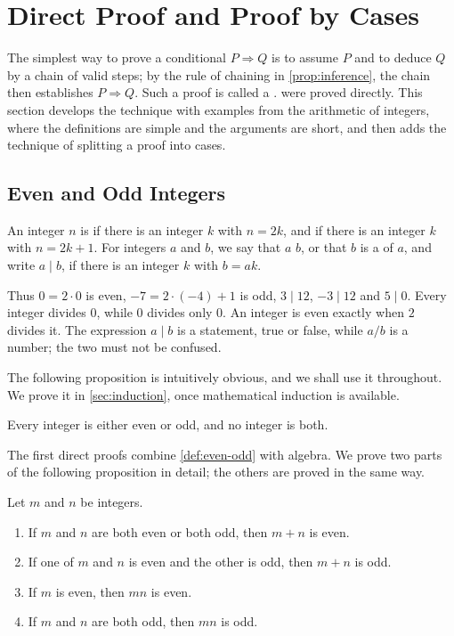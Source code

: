 \section{Direct Proof and Proof by Cases}
\label{sec:direct}

The simplest way to prove a conditional $P\Rightarrow Q$ is to assume $P$ and to deduce $Q$ by a chain of valid steps; by the rule of chaining in \cref{prop:inference}, the chain then establishes $P\Rightarrow Q$. Such a proof is called a .  were proved directly. This section develops the technique with examples from the arithmetic of integers, where the definitions are simple and the arguments are short, and then adds the technique of splitting a proof into cases.

\subsection{Even and Odd Integers}

\begin{definition}
\label{def:even-odd}
An integer $n$ is  if there is an integer $k$ with $n=2k$, and  if there is an integer $k$ with $n=2k+1$. For integers $a$ and $b$, we say that $a$  $b$, or that $b$ is a  of $a$, and write $a\mid b$, if there is an integer $k$ with $b=ak$.
\end{definition}

Thus $0=2\cdot0$ is even, $-7=2\cdot(-4)+1$ is odd, $3\mid 12$, $-3\mid 12$ and $5\mid 0$. Every integer divides $0$, while $0$ divides only $0$. An integer is even exactly when $2$ divides it. The expression $a\mid b$ is a statement, true or false, while $a/b$ is a number; the two must not be confused.

The following proposition is intuitively obvious, and we shall use it throughout. We prove it in \cref{sec:induction}, once mathematical induction is available.

\begin{proposition}[Parity]
\label{prop:parity}
Every integer is either even or odd, and no integer is both.
\end{proposition}

The first direct proofs combine \cref{def:even-odd} with algebra. We prove two parts of the following proposition in detail; the others are proved in the same way.

\begin{proposition}
\label{prop:even-odd-arith}
Let $m$ and $n$ be integers.
\begin{enumerate}
\item If $m$ and $n$ are both even or both odd, then $m+n$ is even.
\item If one of $m$ and $n$ is even and the other is odd, then $m+n$ is odd.
\item If $m$ is even, then $mn$ is even.
\item If $m$ and $n$ are both odd, then $mn$ is odd.
\end{enumerate}
\end{proposition}

